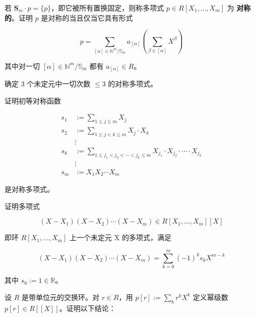\begin{exercises}
\begin{items}
\begin{subitems}
\end{subitems}

\item

若  $ \mathbf{S}_m \cdot p = \{p\} $，即它被所有置换固定，则称多项式  $ p \in R[X_1, \ldots, X_m] $ 为 \textbf{对称的}。证明  $ p $ 是对称的当且仅当它具有形式

\[
p=\sum_{[\alpha]\in\mathbb{N}^{m}/\mathbb{S}_{m}}a_{[\alpha]}\left(\sum_{\beta\in[\alpha]}X^{\beta}\right)
\]

其中对一切  $ [\alpha] \in \mathbb{N}^{m} / \mathbb{S}_{m} $ 都有  $ a_{[\alpha]} \in R $。

\item

确定 3 个未定元中一切次数  $ \leq 3 $ 的对称多项式。

\item

证明初等对称函数

\begin{equation*}
\begin{aligned}
s_{1}&:=\sum_{1\leq j\leq m}X_{j}\\s_{2}&:=\sum_{1\leq j<k\leq m}X_{j}\cdot X_{k}\\&\vdots\\s_{k}&:=\sum_{1\leq j_{1}<j_{2}<\cdots<j_{k}\leq m}X_{j_{1}}\cdot X_{j_{2}}\cdot\cdots\cdot X_{j_{k}}\\&\vdots\\s_{m}&:=X_{1}X_{2}\cdots X_{m}
\end{aligned}
\end{equation*}

是对称多项式。

\item

证明多项式

\[
(X-X_{1})(X-X_{2})\cdots(X-X_{m})\in R[X_{1},\ldots,X_{m}][X]
\]

即环  $ R[X_1,\ldots,X_m] $ 上一个未定元 X 的多项式，满足

\[
(X-X_{1})(X-X_{2})\cdots(X-X_{m})=\sum_{k=0}^{m}(-1)^{k}s_{k}X^{m-k}
\]

其中  $ s_0 := 1 \in \mathbb{R} $。

\end{items}

\item

设 $R$ 是带单位元的交换环。对 $r \in R$，用 $p[r] := \sum_k r^k X^k$ 定义幂级数 $p[r] \in R[[X]]$。证明以下结论：


\end{exercises}
